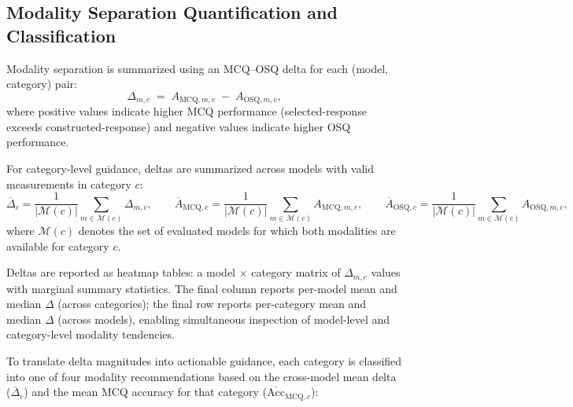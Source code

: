 \subsection{Modality Separation Quantification and Classification}
\label{subsec:ch3_obj7_delta}

Modality separation is summarized using an MCQ--OSQ delta for each (model, category) pair:
\[
\Delta_{m,c} \;=\; A_{\text{MCQ},m,c} \;-\; A_{\text{OSQ},m,c},
\]
where positive values indicate higher MCQ performance (selected-response exceeds constructed-response) and negative values indicate higher OSQ performance.

For category-level guidance, deltas are summarized across models with valid measurements in category $c$:
\[
\overline{\Delta}_c=\frac{1}{|\mathcal{M}(c)|}\sum_{m\in\mathcal{M}(c)} \Delta_{m,c},
\qquad
\overline{A}_{\text{MCQ},c}=\frac{1}{|\mathcal{M}(c)|}\sum_{m\in\mathcal{M}(c)} A_{\text{MCQ},m,c},
\qquad
\overline{A}_{\text{OSQ},c}=\frac{1}{|\mathcal{M}(c)|}\sum_{m\in\mathcal{M}(c)} A_{\text{OSQ},m,c},
\]
where $\mathcal{M}(c)$ denotes the set of evaluated models for which both modalities are available for category $c$.

Deltas are reported as heatmap tables: a model $\times$ category matrix of $\Delta_{m,c}$ values with marginal summary statistics. The final column reports per-model mean and median $\Delta$ (across categories); the final row reports per-category mean and median $\Delta$ (across models), enabling simultaneous inspection of model-level and category-level modality tendencies.

To translate delta magnitudes into actionable guidance, each category is classified into one of four modality recommendations based on the cross-model mean delta ($\overline{\Delta}_c$) and the mean MCQ accuracy for that category ($\overline{\text{Acc}}_{\text{MCQ},c}$):


